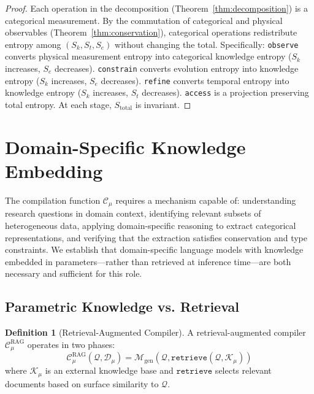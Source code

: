 \documentclass[10pt,twocolumn]{article}
\theoremstyle{definition}
\newtheorem{definition}[theorem]{Definition}
\theoremstyle{remark}
\newcommand{\Sk}{S_k}
\newcommand{\St}{S_t}
\newcommand{\Se}{S_e}
\newcommand{\question}{\mathcal{Q}}
\newcommand{\dataset}{\mathcal{D}}
\newcommand{\model}{\mathcal{M}}
\newcommand{\Sk}{\mathscr{S}_k}
\newcommand{\Se}{\mathscr{S}_e}
\begin{document}
\begin{proof}
Each operation in the decomposition (Theorem~\ref{thm:decomposition}) is a categorical measurement. By the commutation of categorical and physical observables (Theorem~\ref{thm:conservation}), categorical operations redistribute entropy among $(\Sk, \St, \Se)$ without changing the total. Specifically: \texttt{observe} converts physical measurement entropy into categorical knowledge entropy ($\Sk$ increases, $\Se$ decreases). \texttt{constrain} converts evolution entropy into knowledge entropy ($\Sk$ increases, $\Se$ decreases). \texttt{refine} converts temporal entropy into knowledge entropy ($\Sk$ increases, $\St$ decreases). \texttt{access} is a projection preserving total entropy. At each stage, $S_{\text{total}}$ is invariant.
\end{proof}

\section{Domain-Specific Knowledge Embedding}
\label{sec:embedding}

The compilation function $\mathcal{C}_\mu$ requires a mechanism capable of: understanding research questions in domain context, identifying relevant subsets of heterogeneous data, applying domain-specific reasoning to extract categorical representations, and verifying that the extraction satisfies conservation and type constraints. We establish that domain-specific language models with knowledge embedded in parameters---rather than retrieved at inference time---are both necessary and sufficient for this role.

\subsection{Parametric Knowledge vs. Retrieval}

\begin{definition}[Retrieval-Augmented Compiler]
A retrieval-augmented compiler $\mathcal{C}_\mu^{\text{RAG}}$ operates in two phases:
\begin{equation}
\mathcal{C}_\mu^{\text{RAG}}(\question, \dataset_\mu) = \model_{\text{gen}}(\question, \texttt{retrieve}(\question, \mathcal{K}_\mu))
\end{equation}
where $\mathcal{K}_\mu$ is an external knowledge base and $\texttt{retrieve}$ selects relevant documents based on surface similarity to $\question$.
\end{definition}
\end{document}
